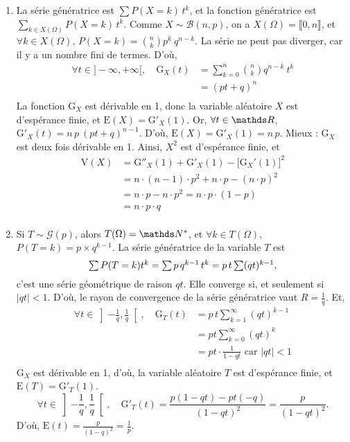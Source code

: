 \begin{exo}
  \begin{enumerate}
    \item La série génératrice est $\sum P(X = k)\, t^k$, et la fonction génératrice est $\sum_{k \in X(\Omega)} P(X = k)\,t^k$.
      Comme $X \sim \mathcal{B}(n,p)$, on a $X(\Omega) = \llbracket 0,n \rrbracket$, et $\forall k \in X(\Omega)$, $P(X = k) = {n\choose k} p^k\:q^{n-k}$.
      La série ne peut pas diverger, car il y a un nombre fini de termes. D'où,
      \begin{align*}
        \forall t \in {]-\infty,+\infty[},\quad \mathrm{G}_X(t) &= \sum_{k=0}^n {n\choose k} q^{n-k}\: t^{k} \\
        &= (pt + q)^n \\
      \end{align*}
      La fonction $\mathrm{G}_X$\/ est dérivable en 1, donc la variable aléatoire $X$\/ est d'espérance finie, et $\mathrm{E}(X) = \mathrm{G}'_X(1)$.
      Or, $\forall t \in \R$, $\mathrm{G}'_X(t) = n\,p\:(pt + q)^{n-1}$.
      D'où, $\mathrm{E}(X) = \mathrm{G}'_X(1) = n\,p$.
      Mieux : $\mathrm{G}_X$\/ est deux fois dérivable en 1. Ainsi, $X^2$\/ est d'espérance finie, et
      \begin{align*}
        \mathrm{V}(X) &= \mathrm{G}''_X(1) + \mathrm{G}'_X(1) - \big[\mathrm{G}_X'(1)\big]^2\\
        &= n\cdot (n-1)\cdot p^2 + n\cdot p - (n\cdot p)^2 \\
        &= n\cdot p - n\cdot p^2 = n\cdot p\cdot (1-p)\\
        &= n\cdot p\cdot q \\
      \end{align*}
    \item Si $T \sim \mathcal{G}(p)$, alors $T(\Omega) = \N^*$, et $\forall k \in T(\Omega)$, $P(T = k) = p \times q^{k-1}$.
      La série génératrice de la variable $T$\/ est \[
        \textstyle \sum P(T = k) t^k = \sum p\,q^{k-1}\,t^k = p\,t \sum (qt)^{k-1}
      ,\] c'est une série géométrique de raison $qt$. Elle converge si, et seulement si $|qt| < 1$. D'où, le rayon de convergence de la série génératrice vaut $R = \frac{1}{q}$.
      Et,
      \begin{align*}
        \forall t \in \left]-\frac{1}{q}, \frac{1}{q} \right[,\quad
        \mathrm{G}_T(t) &= p\,t \sum_{k=1}^\infty (qt)^{k-1}\\
        &= pt \sum_{k=0}^\infty (qt)^k \\
        &= pt \cdot \frac{1}{1-qt} \text{ car } |qt| < 1 \\
      \end{align*}
      $\mathrm{G}_X$\/ est dérivable en 1, d'où, la variable aléatoire $T$\/ est d'espérance finie, et $\mathrm{E}(T) = \mathrm{G}'_T(1)$.
      \[
        \forall t \in \left]-\frac{1}{q}, \frac{1}{q} \right[,\quad
        \mathrm{G}'_T(t) =\frac{p(1-qt) - pt (-q)}{(1-qt)^2}
        = \frac{p}{(1-qt)^2}
      .\] D'où, $\mathrm{E}(t) = \frac{p}{(1-q)^2} = \frac{1}{p}$.
  \end{enumerate}
\end{exo}
